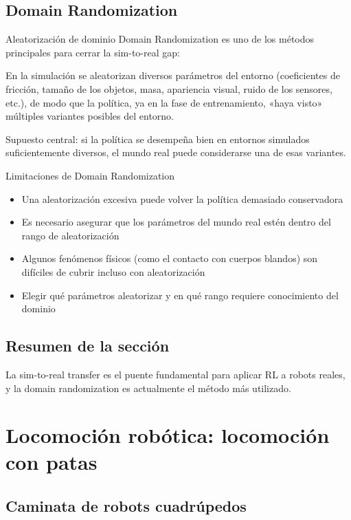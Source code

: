 \documentclass[a4paper]{article}
\begin{document}
\subsection{Domain Randomization}

\begin{importantbox}{Aleatorización de dominio}
Domain Randomization es uno de los métodos principales para cerrar la sim-to-real gap:

En la simulación se aleatorizan diversos parámetros del entorno (coeficientes de fricción, tamaño de los objetos, masa, apariencia visual, ruido de los sensores, etc.), de modo que la política, ya en la fase de entrenamiento, «haya visto» múltiples variantes posibles del entorno.

Supuesto central: si la política se desempeña bien en entornos simulados suficientemente diversos, el mundo real puede considerarse una de esas variantes.
\end{importantbox}

\begin{warningbox}{Limitaciones de Domain Randomization}
\begin{itemize}
    \item Una aleatorización excesiva puede volver la política demasiado conservadora
    \item Es necesario asegurar que los parámetros del mundo real estén dentro del rango de aleatorización
    \item Algunos fenómenos físicos (como el contacto con cuerpos blandos) son difíciles de cubrir incluso con aleatorización
    \item Elegir qué parámetros aleatorizar y en qué rango requiere conocimiento del dominio
\end{itemize}
\end{warningbox}

\subsection{Resumen de la sección}

La sim-to-real transfer es el puente fundamental para aplicar RL a robots reales, y la domain randomization es actualmente el método más utilizado.

\section{Locomoción robótica: locomoción con patas}

\subsection{Caminata de robots cuadrúpedos}
\end{document}
